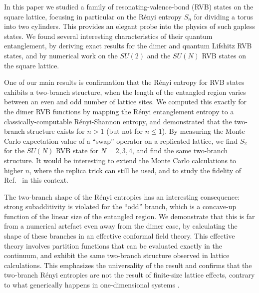 \documentclass[11pt]{iopart}
\begin{document}

In this paper we studied a family of resonating-valence-bond (RVB) states on the square lattice, focusing in particular on the R\'enyi entropy $S_n$ for dividing a torus into two cylinders. This provides an elegant probe into the physics of such gapless states. We found several interesting characteristics of their quantum entanglement, by deriving exact results for the dimer and quantum Lifshitz RVB states, and by numerical work on the $SU(2)$ and the $SU(N)$ RVB states on the square lattice. 

One of our main results is confirmation that the R\'enyi entropy for RVB states exhibits a two-branch structure, when the length of the entangled region varies between an even and odd number of lattice sites. We computed this exactly for the dimer RVB functions by mapping the R\'enyi entanglement entropy to a classically-computable R\'enyi-Shannon entropy, and demonstrated that the two-branch structure exists for {$n>1$ (but not for $n\leq 1$)}.
By measuring the Monte Carlo expectation value of a ``swap'' operator on a replicated lattice, we find $S_2$ for the $SU(N)$ RVB state for $N=2,3,4$, and find the same two-branch structure. It would be interesting to extend the Monte Carlo calculations to higher $n$, where the replica trick can still be used, {and to study the fidelity of Ref.~\cite{Bipartite_fidelity} in this context.} 

The two-branch shape of the R\'enyi entropies has an interesting consequence:  strong subadditivity is violated for the ``odd'' branch, which is a concave-up function of the linear size of the entangled region.  We demonstrate that this is far from a numerical artefact even away from the dimer case, by calculating the shape of these branches in an effective conformal field theory.  This effective theory involves partition functions that can be evaluated exactly in the continuum, and exhibit the same two-branch structure observed in lattice calculations.  This emphasizes the universality of the result and confirms that the two-branch R\'enyi entropies are not the result of finite-size lattice effects, {contrary to what generically happens in one-dimensional systems \cite{Corrections_scaling1,Corrections_scaling2}.} 
\end{document}
